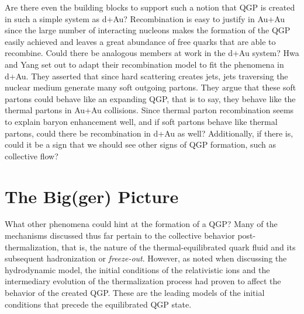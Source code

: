 Are there even the building blocks to support such a notion that QGP is created in such a simple system as d+Au? Recombination is easy to justify in Au+Au since the large number of interacting nucleons makes the formation of the QGP easily achieved and leaves a great abundance of free quarks that are able to recombine. Could there be analogous members at work in the d+Au system? 
Hwa and Yang set out to adapt their recombination model to fit the phenomena in d+Au\citep{PhysRevLett.93.082302}. They asserted that since hard scattering creates jets, jets traversing the nuclear medium generate many soft outgoing partons. They argue that these soft partons could behave like an expanding QGP, that is to say, they behave like the thermal partons in Au+Au collisions. Since thermal parton recombination seems to explain baryon enhancement well, and if soft partons behave like thermal partons, could there be recombination in d+Au as well? Additionally, if there is, could it be a sign that we should see other signs of QGP formation, such as collective flow? 

\section{The Big(ger) Picture}
What other phenomena could hint at the formation of a QGP? Many of the mechanisms discussed thus far pertain to the collective behavior post-thermalization, that is, the nature of the thermal-equilibrated quark fluid and its subsequent hadronization or \textit{freeze-out}. However, as noted when discussing the hydrodynamic model, the initial conditions of the relativistic ions and the intermediary evolution of the thermalization process had proven to affect the behavior of the created QGP. These are the leading models of the initial conditions that precede the equilibrated QGP state.

